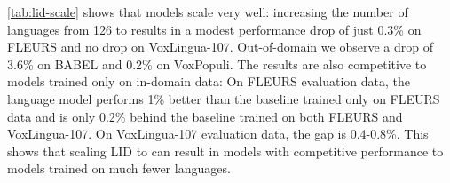 \autoref{tab:lid-scale} shows that \modelname{} models scale very well: 
increasing the number of languages from 126 to \numlidlang{} results in a modest performance drop of just 0.3\% on FLEURS and no drop on VoxLingua-107.
Out-of-domain we observe a drop of 3.6\% on BABEL and 0.2\% on VoxPopuli.
The results are also competitive to models trained only on in-domain data: 
On FLEURS evaluation data, the \numlidlang{} language \modelname{} model performs 1\% better than the baseline trained only on FLEURS data and is only 0.2\% behind the baseline trained on both FLEURS and VoxLingua-107.
On VoxLingua-107 evaluation data, the gap is 0.4-0.8\%.
This shows that scaling LID to \numlidlang{} can result in models with competitive performance to models trained on much fewer languages.
